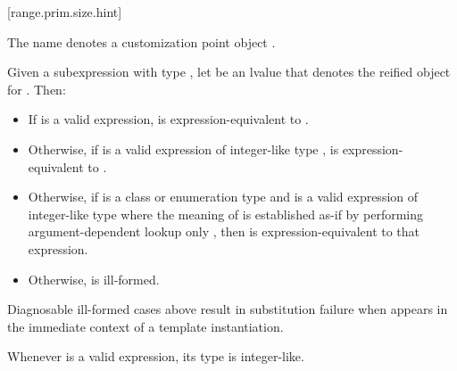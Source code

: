 \documentclass{wg21}
\begin{document}
\begin{addedblock}
[range.prim.size.hint]{}
%

\pnum
The name  denotes a customization point
object .

\pnum
Given a subexpression  with type ,
let  be an lvalue that denotes the reified object for .
Then:

\begin{itemize}
    \item
    If  is a valid expression,  is expression-equivalent to
    .

    \item
    Otherwise, if 
    is a valid expression of integer-like type ,
     is expression-equivalent to
    .

    \item
    Otherwise, if  is a class or enumeration type and 
    is a valid expression of integer-like type
    where the meaning of  is established as-if by performing
    argument-dependent lookup only ,
    then  is expression-equivalent to
    that expression.

    \item
    Otherwise,  is ill-formed.
\end{itemize}

\pnum
\begin{note}
Diagnosable ill-formed cases above
result in substitution failure when 
appears in the immediate context of a template instantiation.
\end{note}

\pnum
\begin{note}
    Whenever  is a valid expression, its
    type is integer-like.
\end{note}

%

\end{addedblock}
\end{document}
